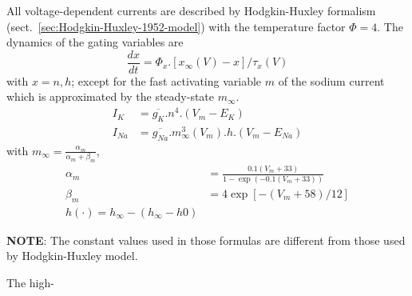 All voltage-dependent currents are described by Hodgkin-Huxley
formalism (sect.~\ref{sec:Hodgkin-Huxley-1952-model}) with the temperature
factor $\Phi = 4$. The dynamics of the gating variables are
\begin{equation}
  \label{eq:561}
  \frac{dx}{dt} = \Phi_x.\left[ x_\infty(V) - x\right]/\tau_x(V)
\end{equation}
with $x = n, h$; except for the fast activating variable $m$ of the
sodium current which is approximated by the steady-state $m_\infty$.
\begin{eqnarray}
  \label{eq:556}
I_{K} &= \overline{g_K} .n^4.(V_m-E_K) \\
  I_{Na} &= \overline{g_{Na}} .m^3_\infty(V_m).h.(V_m-E_{Na})
\end{eqnarray}
with $m_\infty=\frac{\alpha_m}{\alpha_m+\beta_m}$, 
\begin{eqnarray}
  \label{eq:557}
  \alpha_m &= \frac{0.1(V_m+33)}{1-\exp(-0.1(V_m+33))}\\
\beta_m &=  4\exp\left[-(V_m+58)/12\right] \\
h(\cdot) = h_\infty  - (h_\infty - h0)
\end{eqnarray}

{\bf NOTE}: The constant values used in those formulas are different
from those used by Hodgkin-Huxley model.


The high-

